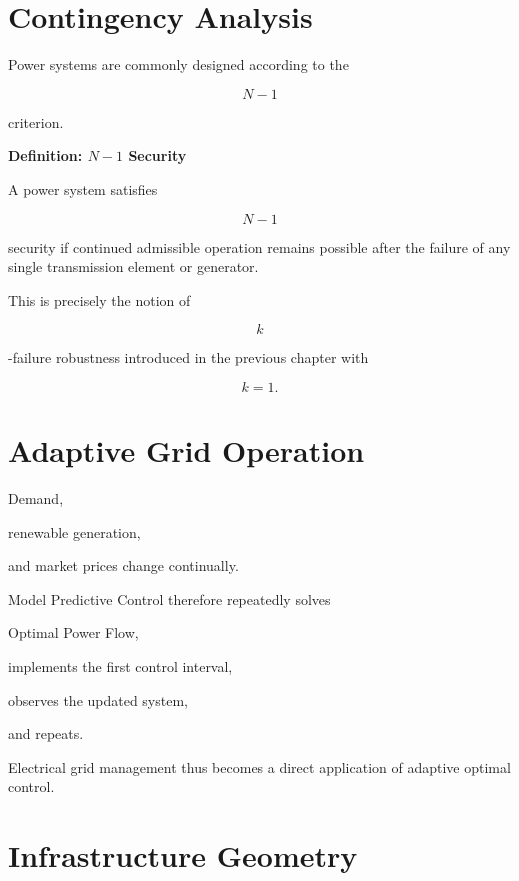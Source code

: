 \documentclass[11pt,fleqn]{book}
\numberwithin{equation}{chapter}
\newenvironment{definition}[1]
  {\begin{definitionEnv}
   \noindent\textbf{Definition: #1}\par\smallskip}
  {\end{definitionEnv}}
\theoremstyle{plain}
\theoremstyle{definition}
\theoremstyle{remark}
\begin{document}

\section{Contingency Analysis}

Power systems are commonly designed according to the

\[
N-1
\]

criterion.


\begin{definition}{\(N-1\) Security}

A power system satisfies

\[
N-1
\]

security if continued admissible operation remains possible after the
failure of any single transmission element or generator.

\end{definition}

This is precisely the notion of

\[
k
\]

-failure robustness introduced in the previous chapter with

\[
k=1.
\]


\section{Adaptive Grid Operation}

Demand,

renewable generation,

and market prices change continually.

Model Predictive Control therefore repeatedly solves

Optimal Power Flow,

implements the first control interval,

observes the updated system,

and repeats.

Electrical grid management thus becomes a direct application of adaptive
optimal control.


\section{Infrastructure Geometry}
\end{document}
